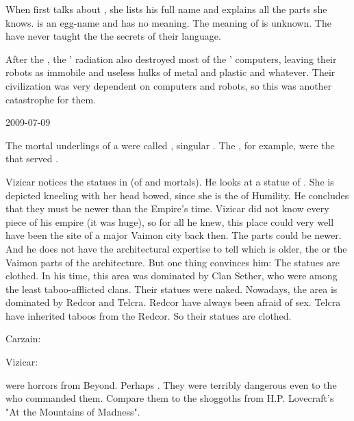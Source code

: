 When \Urizeth first talks about \Ishnaruchaefir, she lists his full name and explains all the parts she knows.
 is an egg-name and has no meaning.
The meaning of \quo{\Ishnaruchaefir} is unknown.
The \dragons have never taught the \resphain the secrets of their language.

After the \firstbanewar, the \banes' radiation also destroyed most of the \ophidians' computers, leaving their robots as immobile and useless hulks of metal and plastic and whatever.
Their civilization was very dependent on computers and robots, so this was another catastrophe for them.



2009-07-09

The mortal underlings of a \resphan \dynasty were called \hedrim, singular \hedor. 
The \hedrim[\Mystraacht], for example, were the \hedrim that served \Mystraacht. 


Vizicar notices the statues in \Forklin (of \sephiroth and mortals). 
He looks at a statue of \Feazirah. 
She is depicted kneeling with her head bowed, since she is the \sephirah of Humility.
He concludes that they must be newer than the Empire's time. 
Vizicar did not know every piece of his empire (it was huge), so for all he knew, this place could very well have been the site of a major Vaimon city back then. 
The \Ortaican parts could be newer. 
And he does not have the architectural expertise to tell which is older, the \Ortaican or the Vaimon parts of the architecture. 
But one thing convinces him: 
The statues are clothed. 
In his time, this area was dominated by Clan Sether, who were among the least taboo-afflicted clans.
Their statues were naked. 
Nowadays, the area is dominated by Redcor and Telcra.
Redcor have always been afraid of sex. 
Telcra have inherited taboos from the Redcor. 
So their statues are clothed. 

\begin{prose}
  Carzain: 
  
  Vizicar:
\end{prose}


\Ghobaleth were horrors from Beyond. 
Perhaps . 
They were terribly dangerous even to the \banes who commanded them.
Compare them to the shoggoths from H.P. Lovecraft's "At the Mountains of Madness". 


